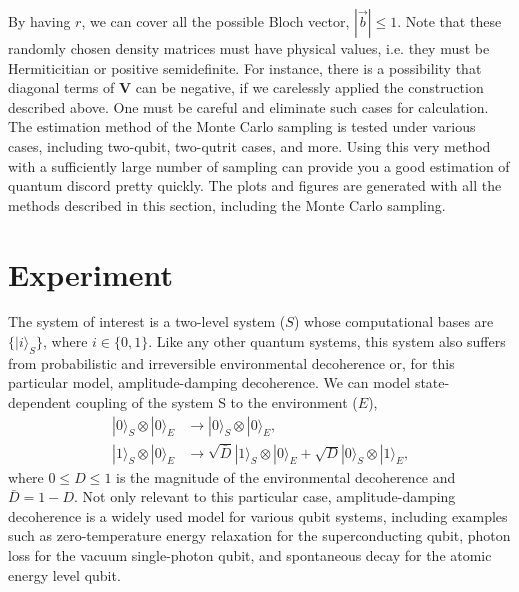 \documentclass[%
 reprint,
 amsmath,amssymb,
 aps,
]{revtex4-1}
\begin{document}
\noindent By having $r$, we can cover all the possible Bloch vector, $|\vec{b}| \le 1$. Note that these randomly chosen density matrices must have physical values, i.e. they must be Hermiticitian or positive semidefinite. For instance, there is a possibility that diagonal terms of $\textbf{V}$ can be negative, if we carelessly applied the construction described above. One must be careful and eliminate such cases for calculation. The estimation method of the Monte Carlo sampling is tested under various cases, including two-qubit, two-qutrit cases, and more. Using this very method with a sufficiently large number of sampling can provide you a good estimation of quantum discord pretty quickly. The plots and figures are generated with all the methods described in this section, including the Monte Carlo sampling. 

\section{Experiment}
\noindent The system of interest is a two-level system ($S$) whose computational bases are $\{|i\rangle_S\}$, where $i \in \{0,1\}$. Like any other quantum systems, this system also suffers from probabilistic and irreversible environmental decoherence or, for this particular model, amplitude-damping decoherence. We can model state-dependent coupling of the system S to the environment ($E$),
\begin{align*}
|0\rangle_S \otimes |0\rangle_E  & \rightarrow  |0\rangle_S \otimes |0\rangle_E \text{,} \\
|1\rangle_S \otimes |0\rangle_E  & \rightarrow  \sqrt{\bar{D}} |1\rangle_S \otimes |0\rangle_E + \sqrt{D} |0\rangle_S \otimes |1\rangle_E \text{,}
\end{align*}
\noindent where $0 \le D \le 1$ is the magnitude of the environmental decoherence and $\bar{D}=1-D$. Not only relevant to this particular case, amplitude-damping decoherence is a widely used model for various qubit systems, including examples such as zero-temperature energy relaxation for the superconducting qubit, photon loss for the vacuum single-photon qubit, and spontaneous decay for the atomic energy level qubit.
\end{document}
